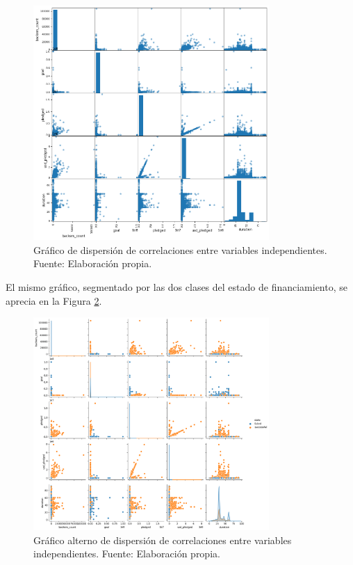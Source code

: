\begin{figure}[!ht]
	\begin{center}
		\includegraphics[width=0.80\textwidth]{4/figures/metadata cor-plot1.png}
		\caption{Gráfico de dispersión de correlaciones entre variables independientes. Fuente: Elaboración propia.}
		\label{4:fig22}
	\end{center}
\end{figure}

El mismo gráfico, segmentado por las dos clases del estado de financiamiento, se aprecia en la Figura \ref{4:fig23}.

\begin{figure}[!ht]
	\begin{center}
		\includegraphics[width=0.80\textwidth]{4/figures/metadata cor-plot2.png}
		\caption{Gráfico alterno de dispersión de correlaciones entre variables independientes. Fuente: Elaboración propia.}
		\label{4:fig23}
	\end{center}
\end{figure}

